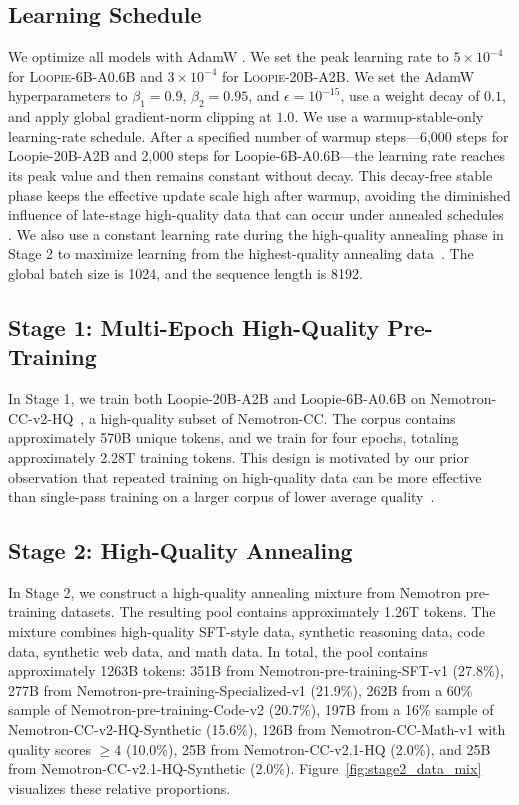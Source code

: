 \subsection{Learning Schedule}
We optimize all models with AdamW \citep{kingma2015adam,loshchilov2019decoupled}. We set the peak learning rate to \(5\times 10^{-4}\) for \textsc{Loopie-6B-A0.6B} and \(3\times 10^{-4}\) for \textsc{Loopie-20B-A2B}. We set the AdamW hyperparameters to \(\beta_1=0.9\), \(\beta_2=0.95\), and \(\epsilon=10^{-15}\), use a weight decay of \(0.1\), and apply global gradient-norm clipping at \(1.0\). We use a warmup-stable-only learning-rate schedule. After a specified number of warmup steps---6,000 steps for Loopie-20B-A2B and 2,000 steps for Loopie-6B-A0.6B---the learning rate reaches its peak value and then remains constant without decay. This decay-free stable phase keeps the effective update scale high after warmup, avoiding the diminished influence of late-stage high-quality data that can occur under annealed schedules \citep{wen2024understanding,luo2025learning,yano2026pretraining}. We also use a constant learning rate during the high-quality annealing phase in Stage 2 to maximize learning from the highest-quality annealing data~\citep{luo2025learning}. The global batch size is 1024, and the sequence length is 8192.

\subsection{Stage 1: Multi-Epoch High-Quality Pre-Training}
In Stage 1, we train both Loopie-20B-A2B and Loopie-6B-A0.6B on Nemotron-CC-v2-HQ~\citep{nemotron-cc}, a high-quality subset of Nemotron-CC. The corpus contains approximately 570B unique tokens, and we train for four epochs, totaling approximately 2.28T training tokens. This design is motivated by our prior observation that repeated training on high-quality data can be more effective than single-pass training on a larger corpus of lower average quality~\citep{gao2025makesdiffusionlanguagemodels}.

\subsection{Stage 2: High-Quality Annealing}
In Stage 2, we construct a high-quality annealing mixture from Nemotron pre-training datasets. The resulting pool contains approximately 1.26T tokens. The mixture combines high-quality SFT-style data, synthetic reasoning data, code data, synthetic web data, and math data. In total, the pool contains approximately 1263B tokens: 351B from Nemotron-pre-training-SFT-v1 (27.8\%), 277B from Nemotron-pre-training-Specialized-v1 (21.9\%), 262B from a 60\% sample of Nemotron-pre-training-Code-v2 (20.7\%), 197B from a 16\% sample of Nemotron-CC-v2-HQ-Synthetic (15.6\%), 126B from Nemotron-CC-Math-v1 with quality scores $\geq 4$ (10.0\%), 25B from Nemotron-CC-v2.1-HQ (2.0\%), and 25B from Nemotron-CC-v2.1-HQ-Synthetic (2.0\%). Figure~\ref{fig:stage2_data_mix} visualizes these relative proportions.

